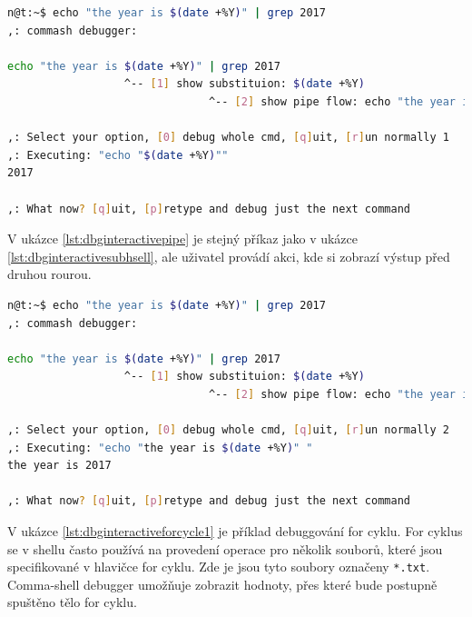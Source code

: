 \documentclass[thesis=M,czech]{FITthesis}[2012/06/26]
\begin{document}
\begin{minipage}{\linewidth}
\begin{lstlisting}[language=bash, caption={Debugger interaktivního shellu - subshell}, label={lst:dbginteractivesubhsell}]
n@t:~$ echo "the year is $(date +%Y)" | grep 2017
,: commash debugger:

echo "the year is $(date +%Y)" | grep 2017
                  ^-- [1] show substituion: $(date +%Y)
                               ^-- [2] show pipe flow: echo "the year is $(date +%Y)"

,: Select your option, [0] debug whole cmd, [q]uit, [r]un normally 1
,: Executing: "echo "$(date +%Y)""
2017

,: What now? [q]uit, [p]retype and debug just the next command
\end{lstlisting}
\end{minipage}

V ukázce \ref{lst:dbginteractivepipe} je stejný příkaz jako v ukázce \ref{lst:dbginteractivesubhsell}, ale uživatel provádí akci, kde si zobrazí výstup před druhou rourou.

\begin{minipage}{\linewidth}
\begin{lstlisting}[language=bash, caption={Debugger interaktivního shellu - subshell}, label={lst:dbginteractivepipe}]
n@t:~$ echo "the year is $(date +%Y)" | grep 2017
,: commash debugger:

echo "the year is $(date +%Y)" | grep 2017
                  ^-- [1] show substituion: $(date +%Y)
                               ^-- [2] show pipe flow: echo "the year is $(date +%Y)"

,: Select your option, [0] debug whole cmd, [q]uit, [r]un normally 2
,: Executing: "echo "the year is $(date +%Y)" "
the year is 2017

,: What now? [q]uit, [p]retype and debug just the next command
\end{lstlisting}
\end{minipage}

V ukázce \ref{lst:dbginteractiveforcycle1} je příklad debuggování for cyklu. For cyklus se v shellu často používá na provedení operace pro několik souborů, které jsou specifikované v hlavičce for cyklu. Zde je jsou tyto soubory označeny \texttt{*.txt}. Comma-shell debugger umožňuje zobrazit hodnoty, přes které bude postupně spuštěno tělo for cyklu.
\end{document}
